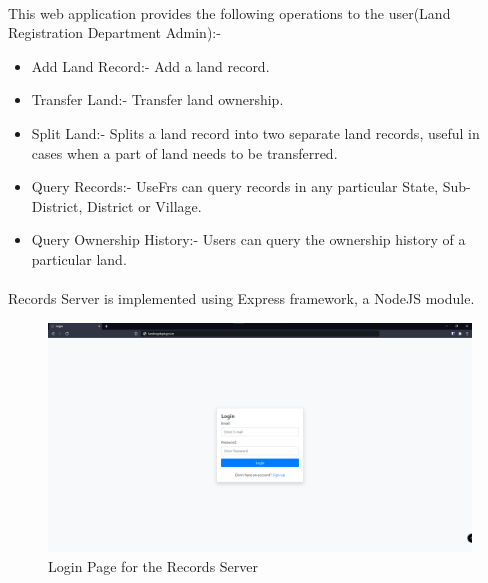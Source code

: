 \documentclass[12pt]{article}
\begin{document}
        \paragraph{}
        This web application provides the following operations to the user(Land Registration Department Admin):-
        \begin{itemize}
            \item Add Land Record:- Add a land record.
            \item Transfer Land:- Transfer land ownership.
            \item Split Land:- Splits a land record into two separate land records, useful in cases when a part of land needs to be transferred.
            \item Query Records:- UseFrs can query records in any particular State, Sub-District, District or Village.
            \item Query Ownership History:- Users can query the ownership history of a particular land.
        \end{itemize}

        \paragraph{}
        Records Server is implemented using Express framework, a NodeJS module.

        \begin{figure}[H]
            \includegraphics[scale=0.25]{records_login}
            \centering
            \caption{Login Page for the Records Server}
        \end{figure}
\end{document}
